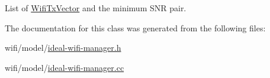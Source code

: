 List of \hyperlink{classns3_1_1WifiTxVector}{Wifi\+Tx\+Vector} and the minimum S\+NR pair. 



The documentation for this class was generated from the following files\+:\begin{DoxyCompactItemize}
\item 
wifi/model/\hyperlink{ideal-wifi-manager_8h}{ideal-\/wifi-\/manager.\+h}\item 
wifi/model/\hyperlink{ideal-wifi-manager_8cc}{ideal-\/wifi-\/manager.\+cc}\end{DoxyCompactItemize}
